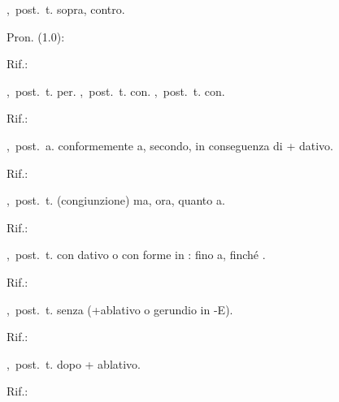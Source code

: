 ,\ post.\ t.
sopra, contro.
\begin{subvocedue}
\item[Pron. (1.0):] 
\item[Rif.:] 
\end{subvocedue}
,\ post.\ t.
per.
,\ post.\ t.
con.
,\ post.\ t.
con.
\begin{subvocedue}
\item[Rif.:] 
\end{subvocedue}
,\ post.\ a.
conformemente a, secondo, in conseguenza di + dativo.
\begin{subvocedue}
\item[Rif.:] 
\end{subvocedue}
,\ post.\ t.
(congiunzione) ma, ora, quanto a.
\begin{subvocedue}
\item[Rif.:] 
\end{subvocedue}
,\ post.\ t.
con dativo o con forme in : fino a, finché \verificare.
\begin{subvocedue}
\item[Rif.:] 
\end{subvocedue}
,\ post.\ t.
senza (+ablativo o gerundio in -E).
\begin{subvocedue}
\item[Rif.:] 
\end{subvocedue}
,\ post.\ t.
dopo + ablativo.
\begin{subvocedue}
\item[Rif.:] 
\end{subvocedue}

